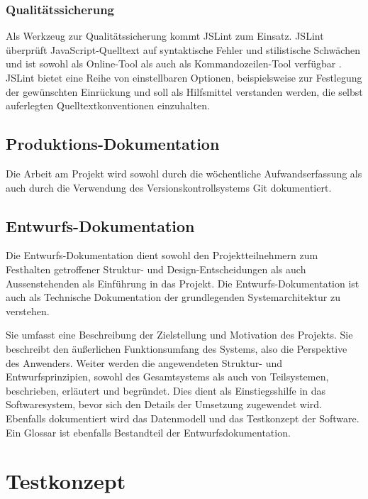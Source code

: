 \subsubsection{Qualitätssicherung}

Als Werkzeug zur Qualitätssicherung kommt JSLint zum Einsatz.
JSLint überprüft JavaScript-Quelltext auf syntaktische Fehler und
stilistische Schwächen und ist sowohl als Online-Tool
\cite{jslintonline} als auch als Kommandozeilen-Tool
verfügbar \cite{jslintclt}.
JSLint bietet eine Reihe von einstellbaren Optionen, beispielsweise
zur Festlegung der gewünschten Einrückung und soll als Hilfsmittel
verstanden werden, die selbst auferlegten Quelltextkonventionen einzuhalten.

\subsection{Produktions-Dokumentation}

Die Arbeit am Projekt wird sowohl durch die wöchentliche
Aufwandserfassung als auch durch die Verwendung des
Versionskontrollsystems Git dokumentiert.

\subsection{Entwurfs-Dokumentation}

Die Entwurfs-Dokumentation dient sowohl den Projektteilnehmern zum
Festhalten getroffener Struktur- und Design-Entscheidungen als auch
Aussenstehenden als Einführung in das Projekt.
Die Entwurfs-Dokumentation ist auch als Technische Dokumentation der
grundlegenden Systemarchitektur zu verstehen.

Sie umfasst eine Beschreibung der Zielstellung und Motivation des
Projekts.
Sie beschreibt den äußerlichen Funktionsumfang des Systems, also die
Perspektive des Anwenders.
Weiter werden die angewendeten Struktur- und Entwurfsprinzipien,
sowohl des Gesamtsystems als auch von Teilsystemen, beschrieben,
erläutert und begründet. Dies dient als Einstiegsshilfe in das
Softwaresystem, bevor sich den Details der Umsetzung zugewendet wird.
Ebenfalls dokumentiert wird das Datenmodell und das Testkonzept der
Software.
Ein Glossar ist ebenfalls Bestandteil der Entwurfsdokumentation.

\section{Testkonzept}

